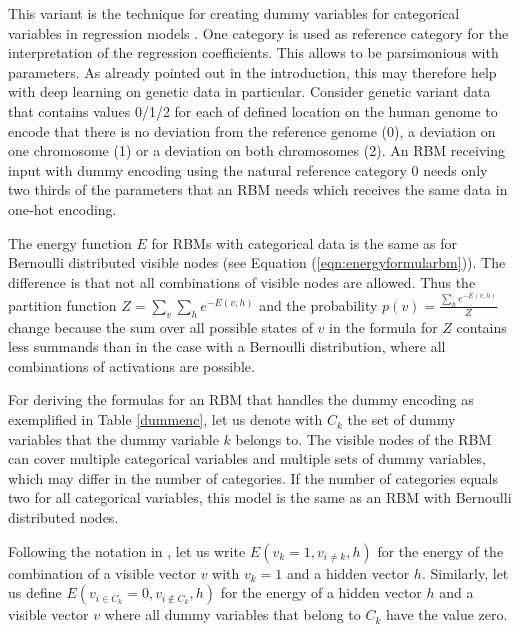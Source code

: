 \documentclass[12pt]{article}
\begin{document}
This variant is the technique for creating dummy variables for categorical variables in regression models \citep{faraway_regression}.
One category is used as reference category for the interpretation of the regression coefficients.
This allows to be parsimonious with parameters.
As already pointed out in the introduction, this may therefore help with deep learning on genetic data in particular.
Consider genetic variant data that contains values 0/1/2 for each of defined location on the human genome to encode that there is no deviation from the reference genome (0), a deviation on one chromosome (1) or a deviation on both chromosomes (2).
An RBM receiving input with dummy encoding using the natural reference category 0 needs only two thirds of the parameters that an RBM needs which receives the same data in one-hot encoding.

The energy function $E$ for RBMs with categorical data is the same as for Bernoulli distributed visible nodes (see Equation (\ref{eqn:energyformularbm})).
The difference is that not all combinations of visible nodes are allowed. Thus the partition function $Z = \sum_{v} \sum_{h} e^{-E(v,h)}$ and the probability
$p(v) = \frac{\sum_h e^{-E(v,h)}}{Z}$ change because the sum over all possible states of $v$ in the formula for $Z$ contains less summands than in the case with a Bernoulli distribution, where all combinations of activations are possible.

For deriving the formulas for an RBM that handles the dummy encoding as exemplified in Table \ref{dummenc}, let us denote with $C_k$ the set of dummy variables that the dummy variable $k$ belongs to.
The visible nodes of the RBM can cover multiple categorical variables and multiple sets of dummy variables, which may differ in the number of categories.
If the number of categories equals two for all categorical variables, this model is the same as an RBM with Bernoulli distributed nodes.

Following the notation in \cite{krizhevsky2009tinyimagesthesis}, let us write $E(v_k = 1, v_{i \neq k}, h)$ for the energy of the combination of a visible vector $v$ with $v_k = 1$ and a hidden vector $h$. Similarly, let us define $E(v_{i \in C_k} = 0, v_{i \notin C_k}, h)$ for the energy of a hidden vector $h$ and a visible vector $v$ where all dummy variables that belong to $C_k$ have the value zero.
\end{document}
